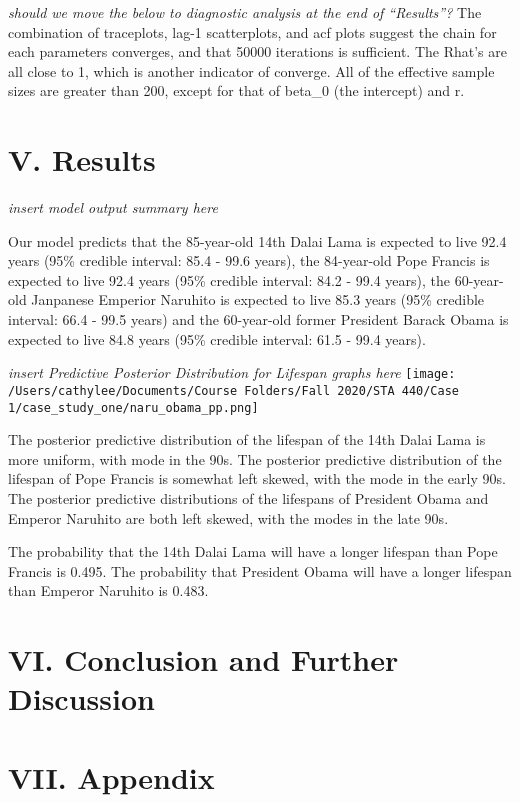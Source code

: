 \documentclass[]{article}
\begin{document}
\emph{should we move the below to diagnostic analysis at the end of
``Results''?} The combination of traceplots, lag-1 scatterplots, and acf
plots suggest the chain for each parameters converges, and that 50000
iterations is sufficient. The Rhat's are all close to 1, which is
another indicator of converge. All of the effective sample sizes are
greater than 200, except for that of beta\_0 (the intercept) and r.

\hypertarget{v.-results}{%
\section{V. Results}\label{v.-results}}

\emph{insert model output summary here}

Our model predicts that the 85-year-old 14th Dalai Lama is expected to
live 92.4 years (95\% credible interval: 85.4 - 99.6 years), the
84-year-old Pope Francis is expected to live 92.4 years (95\% credible
interval: 84.2 - 99.4 years), the 60-year-old Janpanese Emperior
Naruhito is expected to live 85.3 years (95\% credible interval: 66.4 -
99.5 years) and the 60-year-old former President Barack Obama is
expected to live 84.8 years (95\% credible interval: 61.5 - 99.4 years).

\emph{insert Predictive Posterior Distribution for Lifespan graphs here}
\texttt{[image: /Users/cathylee/Documents/Course Folders/Fall 2020/STA 440/Case 1/case\_study\_one/naru\_obama\_pp.png]}

The posterior predictive distribution of the lifespan of the 14th Dalai
Lama is more uniform, with mode in the 90s. The posterior predictive
distribution of the lifespan of Pope Francis is somewhat left skewed,
with the mode in the early 90s. The posterior predictive distributions
of the lifespans of President Obama and Emperor Naruhito are both left
skewed, with the modes in the late 90s.

The probability that the 14th Dalai Lama will have a longer lifespan
than Pope Francis is 0.495. The probability that President Obama will
have a longer lifespan than Emperor Naruhito is 0.483.

\hypertarget{vi.-conclusion-and-further-discussion}{%
\section{VI. Conclusion and Further
Discussion}\label{vi.-conclusion-and-further-discussion}}

\hypertarget{vii.-appendix}{%
\section{VII. Appendix}\label{vii.-appendix}}
\end{document}
